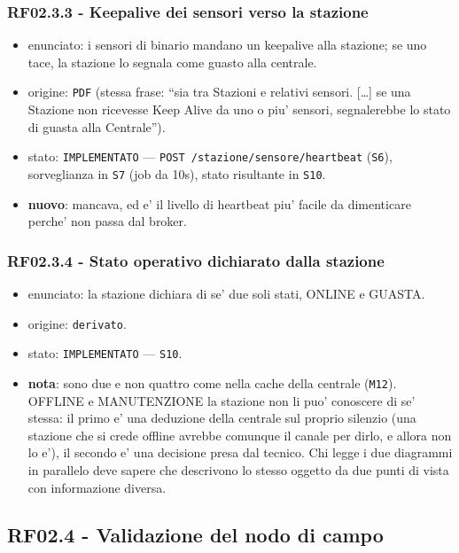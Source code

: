 \documentclass[11pt]{article}
\begin{document}
\subsubsection{RF02.3.3 - Keepalive dei sensori verso la stazione}
\label{sec:org154790b}
\begin{itemize}
\item enunciato: i sensori di binario mandano un keepalive alla stazione; se uno tace, la stazione lo
segnala come guasto alla centrale.
\item origine: \texttt{PDF} (stessa frase: ``sia tra Stazioni e relativi sensori. [\ldots{}] se una Stazione non
ricevesse Keep Alive da uno o piu' sensori, segnalerebbe lo stato di guasta alla Centrale'').
\item stato: \texttt{IMPLEMENTATO} — \texttt{POST /stazione/sensore/heartbeat} (\texttt{S6}), sorveglianza in \texttt{S7} (job da
10s), stato risultante in \texttt{S10}.
\item \textbf{nuovo}: mancava, ed e' il livello di heartbeat piu' facile da dimenticare perche' non passa dal
broker.
\end{itemize}
\subsubsection{RF02.3.4 - Stato operativo dichiarato dalla stazione}
\label{sec:orgf27b528}
\begin{itemize}
\item enunciato: la stazione dichiara di se' due soli stati, ONLINE e GUASTA.
\item origine: \texttt{derivato}.
\item stato: \texttt{IMPLEMENTATO} — \texttt{S10}.
\item \textbf{nota}: sono due e non quattro come nella cache della centrale (\texttt{M12}). OFFLINE e MANUTENZIONE la
stazione non li puo' conoscere di se' stessa: il primo e' una deduzione della centrale sul proprio
silenzio (una stazione che si crede offline avrebbe comunque il canale per dirlo, e allora non lo
e'), il secondo e' una decisione presa dal tecnico. Chi legge i due diagrammi in parallelo deve
sapere che descrivono lo stesso oggetto da due punti di vista con informazione diversa.
\end{itemize}
\subsection{RF02.4 - Validazione del nodo di campo}
\label{sec:orgab1bb2f}
\end{document}
